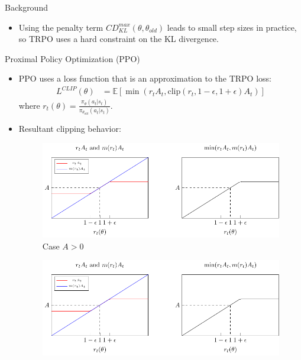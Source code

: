 \documentclass{beamer}
\begin{document}
\begin{frame}{Background}
\begin{itemize}
        \item Using the penalty term $CD_{KL}^{max}(\theta, \theta_{old})$
        leads to small step sizes in practice, so TRPO uses a hard constraint
        on the KL divergence.
    \end{itemize}
    \framebreak
    Proximal Policy Optimization (PPO)
    \begin{itemize}
        \item PPO uses a loss function that is an approximation to the TRPO
            loss:
        \begin{align*}
            L^{CLIP}(\theta) &= \mathbb{E}\left[ 
            \min\left(r_tA_t, \text{clip}
            (r_t, 1 - \epsilon, 1 + \epsilon)A_t\right)
            \right]
        \end{align*}
        where 
        $r_t(\theta) = 
        \frac
        {\pi_{\theta}(a_t | s_t)}
        {\pi_{\theta_{old}} (a_t | s_t)}$.
        \framebreak
        \item Resultant clipping behavior:\\
        \begin{center}
            \begin{figure}[H]
                \includegraphics[page=1, scale=0.6]{clip_graph/clip_graph}
                \caption{Case $A > 0$}
            \end{figure}
            \begin{figure}[H]
                \includegraphics[page=2, scale=0.6]{clip_graph/clip_graph}

\end{figure}
\end{center}
\end{itemize}
\end{frame}
\end{document}

